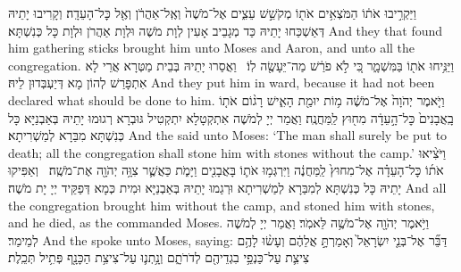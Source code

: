 {וַיַּקְרִ֣יבוּ אֹת֔וֹ הַמֹּצְאִ֥ים אֹת֖וֹ מְקֹשֵׁ֣שׁ עֵצִ֑ים אֶל־מֹשֶׁה֙ וְאֶֽל־אַהֲרֹ֔ן וְאֶ֖ל כׇּל־הָעֵדָֽה׃
}
{וְקָרִיבוּ יָתֵיהּ דְּאַשְׁכַּחוּ יָתֵיהּ כַּד מְגָבֵיב אָעִין לְוָת מֹשֶׁה וּלְוָת אַהֲרֹן וּלְוָת כָּל כְּנִשְׁתָּא׃}
{And they that found him gathering sticks brought him unto Moses and Aaron, and unto all the congregation.}{}
{וַיַּנִּ֥יחוּ אֹת֖וֹ בַּמִּשְׁמָ֑ר כִּ֚י לֹ֣א פֹרַ֔שׁ מַה־יֵּעָשֶׂ֖ה לֽוֹ׃ \setuma 
{}}
{וַאֲסַרוּ יָתֵיהּ בְּבֵית מַטְּרָא אֲרֵי לָא אִתְפָּרַשׁ לְהוֹן מָא דְּיַעְבְּדוּן לֵיהּ׃}
{And they put him in ward, because it had not been declared what should be done to him.}{}
{וַיֹּ֤אמֶר יְהֹוָה֙ אֶל־מֹשֶׁ֔ה מ֥וֹת יוּמַ֖ת הָאִ֑ישׁ רָג֨וֹם אֹת֤וֹ בָֽאֲבָנִים֙ כׇּל־הָ֣עֵדָ֔ה מִח֖וּץ לַֽמַּחֲנֶֽה׃
}
{וַאֲמַר יְיָ לְמֹשֶׁה אִתְקְטָלָא יִתְקְטִיל גּוּבְרָא רְגוּמוּ יָתֵיהּ בְּאַבְנַיָּא כָּל כְּנִשְׁתָּא מִבַּרָא לְמַשְׁרִיתָא׃}
{And the \lord\space said unto Moses: ‘The man shall surely be put to death; all the congregation shall stone him with stones without the camp.’}{}
{וַיֹּצִ֨יאוּ אֹת֜וֹ כׇּל־הָעֵדָ֗ה אֶל־מִחוּץ֙ לַֽמַּחֲנֶ֔ה וַיִּרְגְּמ֥וּ אֹת֛וֹ בָּאֲבָנִ֖ים וַיָּמֹ֑ת כַּאֲשֶׁ֛ר צִוָּ֥ה יְהֹוָ֖ה אֶת־מֹשֶֽׁה׃ \petucha 
{}}
{וְאַפִּיקוּ יָתֵיהּ כָּל כְּנִשְׁתָּא לְמִבַּרָא לְמַשְׁרִיתָא וּרְגַמוּ יָתֵיהּ בְּאַבְנַיָּא וּמִית כְּמָא דְּפַקֵּיד יְיָ יָת מֹשֶׁה׃}
{And all the congregation brought him without the camp, and stoned him with stones, and he died, as the \lord\space commanded Moses.}{}
{וַיֹּ֥אמֶר יְהֹוָ֖ה אֶל־מֹשֶׁ֥ה לֵּאמֹֽר׃}
{וַאֲמַר יְיָ לְמֹשֶׁה לְמֵימַר׃}
{And the \lord\space spoke unto Moses, saying:}{}
{דַּבֵּ֞ר אֶל־בְּנֵ֤י יִשְׂרָאֵל֙ וְאָמַרְתָּ֣ אֲלֵהֶ֔ם וְעָשׂ֨וּ לָהֶ֥ם צִיצִ֛ת עַל־כַּנְפֵ֥י בִגְדֵיהֶ֖ם לְדֹרֹתָ֑ם וְנָ֥תְנ֛וּ עַל־צִיצִ֥ת הַכָּנָ֖ף פְּתִ֥יל תְּכֵֽלֶת׃
}
